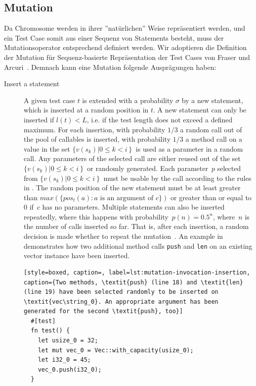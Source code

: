 \documentclass[paper=a4,%
  twoside,%
  BCOR4mm,%
  abstract=true,%
  toc=bibliography,%
  chapterprefix=true,%
  toc=bibliographynumbered,%
  open=right,%
  english,%
  pagesize=pdftex]{scrreprt}
\begin{document}
\subsection{Mutation}
Da Chromosome werden in ihrer ''natürlichen'' Weise repräsentiert werden, und ein Test Case somit aus einer Sequenz von Statements besteht, muss der Mutationsoperator entsprechend definiert werden. Wir adoptieren die Definition der Mutation für Sequenz-basierte Repräsentation der Test Cases von Fraser und Arcuri~\cite{Fraser2012}. Demnach kann eine Mutation folgende Ausprägungen haben:
\begin{description}
  \item[Insert a statement] A given test case $t$ is extended with a probability $\sigma$ by a new statement, which is inserted at a random position in $t$. A new statement can only be inserted if $l(t) < L$, i.e. if the test length does not exceed a defined maximum. For each insertion, with probability $1/3$ a random call out of the pool of callables is inserted, with probability $1/3$ a method call on a value in the set $\{v(s_k) \left| 0 \leq k < i \right\}$ is used as a parameter in a random call. Any parameters of the selected call are either reused out of the set $\{v(s_k) \left| 0 \leq k < i \right\}$ or randomly generated. Each parameter~$p$ selected from $\{v(s_k) \left| 0 \leq k < i \right\}$ must be usable by the call according to the rules in . The random position of the new statement must be at least greater than $max(\{pos_t(a) : a \text{ is an argument of } c\})$ or greater than or equal to $0$ if~$c$ has no parameters. Multiple statements can also be inserted repeatedly, where this happens with probability~$p(n) = 0.5^n$, where~$n$ is the number of calls inserted so far. That is, after each insertion, a random decision is made whether to repeat the mutation~\cite{Tonella2004}. An example in  demonstrates how two additional method calls \texttt{push} and \texttt{len} on an existing vector instance have been inserted. 

  \begin{lstlisting}[style=boxed, caption=, label=lst:mutation-invocation-insertion, caption={Two methods, \textit{push} (line 18) and \textit{len} (line 19) have been selected randomly to be inserted on \textit{vec\string_0}. An appropriate argument has been generated for the second \textit{push}, too}]
  #[test]
  fn test() {
    let usize_0 = 32;
    let mut vec_0 = Vec::with_capacity(usize_0);
    let i32_0 = 45;
    vec_0.push(i32_0);
  }


\end{lstlisting}
\end{description}
\end{document}
